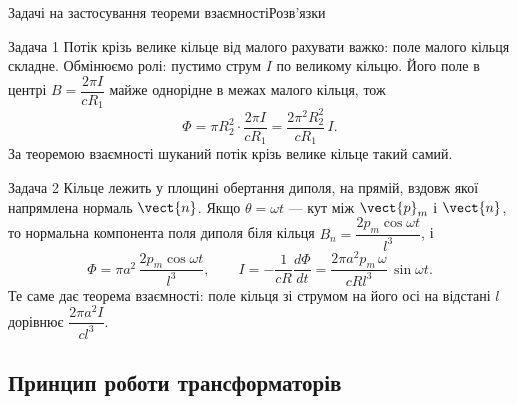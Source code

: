 \documentclass[onlytextwidth]{beamer}
\begin{document}
\begin{frame}{Задачі на застосування теореми взаємності}{Розв'язки}\small
	\begin{block}{Задача 1}\justifying
		Потік крізь велике кільце від малого рахувати важко: поле малого кільця складне. Обмінюємо ролі: пустимо струм $I$ по
		\alert{великому} кільцю. Його поле в центрі $B = \dfrac{2\pi I}{cR_1}$ майже однорідне в межах малого кільця, тож
		\begin{equation*}
			\Phi = \pi R_2^2 \cdot \frac{2\pi I}{cR_1} = \frac{2\pi^2 R_2^2}{cR_1}\, I.
		\end{equation*}
		За теоремою взаємності шуканий потік крізь велике кільце такий самий.
	\end{block}
	\begin{block}{Задача 2}\justifying
		Кільце лежить у площині обертання диполя, на прямій, вздовж якої напрямлена нормаль $\vect{n}$. Якщо $\theta = \omega t$ --- кут між
		$\vect{p}_m$ і $\vect{n}$, то нормальна компонента поля диполя біля кільця $B_n = \dfrac{2p_m\cos\omega t}{l^3}$, і
		\begin{equation*}
			\Phi = \pi a^2\,\frac{2p_m\cos\omega t}{l^3},
			\qquad
			I = -\frac{1}{cR}\frac{d\Phi}{dt} = \frac{2\pi a^2 p_m\,\omega}{cRl^3}\,\sin\omega t.
		\end{equation*}
		Те саме дає теорема взаємності: поле кільця зі струмом на його осі на відстані $l$ дорівнює $\dfrac{2\pi a^2 I}{cl^3}$.
	\end{block}
\end{frame}


\subsection{Принцип роботи трансформаторів}
\end{document}
